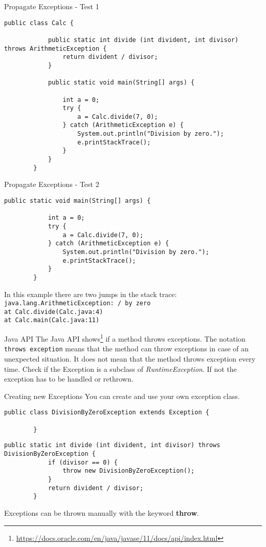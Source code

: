 \begin{frame}[fragile]{Propagate Exceptions - Test 1}
	\begin{lstlisting}[basicstyle=\ttfamily\scriptsize]
		public class Calc {
			
			public static int divide (int divident, int divisor) throws ArithmeticException {
				return divident / divisor;
			}
			
			public static void main(String[] args) {
				
				int a = 0;
				try {
					a = Calc.divide(7, 0);
				} catch (ArithmeticException e) {
					System.out.println("Division by zero.");
					e.printStackTrace();
				}
			}
		}
	\end{lstlisting}
\end{frame}

\begin{frame}[fragile]{Propagate Exceptions - Test 2}
	\begin{lstlisting}[basicstyle=\ttfamily\scriptsize, firstnumber=7]
		public static void main(String[] args) {
			
			int a = 0;
			try {
				a = Calc.divide(7, 0);
			} catch (ArithmeticException e) {
				System.out.println("Division by zero.");
				e.printStackTrace();
			}
		}
	\end{lstlisting}
	In this example there are two jumps in the stack trace:\\
	\texttt{java.lang.ArithmeticException: / by zero}\\
	\texttt{at Calc.divide(Calc.java:4)}\\
	\texttt{at Calc.main(Calc.java:11)}
\end{frame}

\begin{frame}{Java API}
	The Java API shows\footnote{\scriptsize\url{https://docs.oracle.com/en/java/javase/11/docs/api/index.html}}
	if a method throws exceptions. 
	The notation \texttt{throws exception} means that the method can throw 
	exceptions in case of an unexpected situation.
	It does not mean that the method throws exception every time.
	\vfill
	Check if the Exception is a subclass of \emph{RuntimeException}. 
	If not the exception has to be handled or rethrown.
\end{frame}

\begin{frame}[fragile]{Creating new Exceptions}
	You can create and use your own exception class.
	\begin{lstlisting}[basicstyle=\ttfamily\scriptsize]
		public class DivisionByZeroException extends Exception {
			
		}
	\end{lstlisting}
	\vfill
	\begin{lstlisting}[basicstyle=\ttfamily\scriptsize]
		public static int divide (int divident, int divisor) throws DivisionByZeroException {
			if (divisor == 0) {
				throw new DivisionByZeroException();
			}
			return divident / divisor;
		}
	\end{lstlisting}	
	Exceptions can be thrown manually with the keyword \textbf{throw}.
\end{frame}


